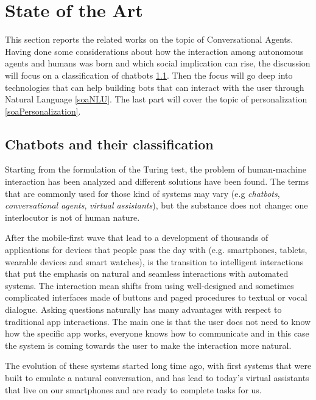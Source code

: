
\chapter{State of the Art}
\label{soa}

This section reports the related works on the topic of Conversational Agents. Having done some considerations about how the interaction among autonomous agents and humans was born and which social implication can rise, the discussion will focus on a classification of chatbots \ref{soaClassification}. Then the focus will go deep into technologies that can help building bots that can interact with the user through Natural Language \ref{soaNLU}. The last part will cover the topic of personalization \ref{soaPersonalization}.

\section{Chatbots and their classification}
\label{soaClassification}

Starting from the formulation of the Turing test, the problem of human-machine interaction has been analyzed and different solutions have been found. The terms that are commonly used for those kind of systems may vary (e.g \textit{chatbots}, \textit{conversational agents}, \textit{virtual assistants}), but the substance does not change: one interlocutor is not of human nature.

After the mobile-first wave that lead to a development of thousands of applications for devices that people pass the day with (e.g. smartphones, tablets, wearable devices and smart watches), is the transition to intelligent interactions that put the emphasis on natural and seamless interactions with automated systems. The interaction mean shifts from using well-designed and sometimes complicated interfaces made of buttons and paged procedures to textual or vocal dialogue. Asking questions naturally has many advantages with respect to traditional app interactions. The main one is that the user does not need to know how the specific app works, everyone knows how to communicate and in this case the system is coming towards the user to make the interaction more natural.

The evolution of these systems started long time ago, with first systems that were built to emulate a natural conversation, and has lead to today's virtual assistants that live on our smartphones and are ready to complete tasks for us.

